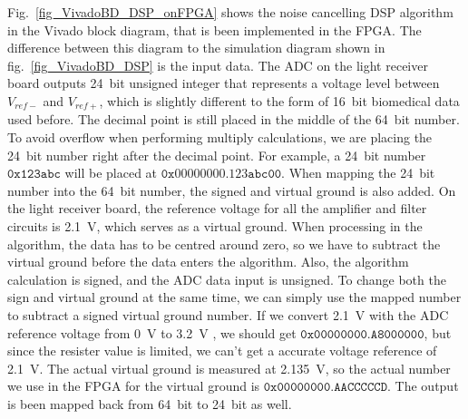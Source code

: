 Fig.~\ref{fig_VivadoBD_DSP_onFPGA} shows the noise cancelling DSP algorithm in the Vivado block diagram, that is been implemented in the FPGA.  The difference between this diagram to the simulation diagram shown in fig.~\ref{fig_VivadoBD_DSP} is the input data.  The ADC on the light receiver board outputs \qty{24}{bit} unsigned integer that represents a voltage level between $V_{ref-}$ and $V_{ref+}$, which is slightly different to the form of \qty{16}{bit} biomedical data used before.  The decimal point is still placed in the middle of the \qty{64}{bit} number.  To avoid overflow when performing multiply calculations, we are placing the \qty{24}{bit} number right after the decimal point.  For example, a \qty{24}{bit} number $\mathtt{0x123abc}$ will be placed at $\mathtt{0x00000000.123abc00}$.  When mapping the \qty{24}{bit} number into the \qty{64}{bit} number, the signed and virtual ground is also added.  On the light receiver board, the reference voltage for all the amplifier and filter circuits is \qty{2.1}{V}, which serves as a virtual ground.  When processing in the algorithm, the data has to be centred around zero, so we have to subtract the virtual ground before the data enters the algorithm.  Also, the algorithm calculation is signed, and the ADC data input is unsigned.  To change both the sign and virtual ground at the same time, we can simply use the mapped number to subtract a signed virtual ground number. 
 If we convert \qty{2.1}{V} with the ADC reference voltage from \qty{0}{V} to \qty{3.2}{V} , we should get $\mathtt{0x00000000.A8000000}$, but since the resister value is limited, we can't get a accurate voltage reference of \qty{2.1}{V}.  The actual virtual ground is measured at \qty{2.135}{V}, so the actual number we use in the FPGA for the virtual ground is $\mathtt{0x00000000.AACCCCCD}$.  The output is been mapped back from \qty{64}{bit} to \qty{24}{bit} as well.

